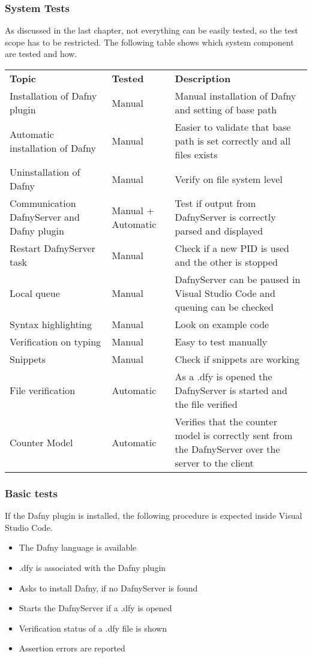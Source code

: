 \subsubsection{System Tests}
As discussed in the last chapter, not everything can be easily tested, so the test scope has to be restricted. The following table shows which system component are tested and how.
\begin{longtable}{ p{} | p{} | p{} }
	\textbf{Topic} & \textbf{Tested} & \textbf{Description}\\
	Installation of Dafny plugin & Manual & Manual installation of Dafny and setting of base path   \\
	Automatic installation of Dafny & Manual & Easier to validate that base path is set correctly and all files exists \\
	Uninstallation of Dafny & Manual & Verify on file system level\\
	Communication DafnyServer and Dafny plugin & Manual + Automatic & Test if output from DafnyServer is correctly parsed and displayed\\
	Restart DafnyServer task & Manual & Check if a new PID is used and the other is stopped\\
	Local queue & Manual & DafnyServer can be paused in Visual Studio Code and queuing can be checked \\
	Syntax highlighting & Manual & Look on example code \\
	Verification on typing & Manual & Easy to test manually\\
	Snippets & Manual & Check if snippets are working\\
	File verification & Automatic & As a .dfy is opened the DafnyServer is started and the file verified \\
	Counter Model & Automatic & Verifies that the counter model is correctly sent from the DafnyServer over the server to the client \\

\end{longtable}


\subsubsection{Basic tests}
If the Dafny plugin is installed, the following procedure is expected inside Visual Studio Code. 
\begin{itemize}
	\item The Dafny language is available
	\item .dfy is associated with the Dafny plugin
	\item Asks to install Dafny, if no DafnyServer is found 
	\item Starts the DafnyServer if a .dfy is opened
	\item Verification status of a .dfy file is shown
	\item Assertion errors are reported
\end{itemize}

